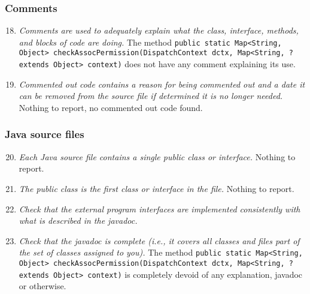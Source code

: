 	\subsubsection{Comments}
		\begin{enumerate}
			\setcounter{enumi}{17}
			\item \textit{Comments are used to adequately explain what the class, interface, methods, and blocks of code are doing.}
			The method \texttt{public static Map<String, Object> checkAssocPermission(DispatchContext dctx, Map<String, ? extends Object> context)} does not have any comment explaining its use. 

			\item \textit{Commented out code contains a reason for being commented out and a date it can be removed from the source file if determined it is no longer needed.}\newline
			Nothing to report, no commented out code found. %

		\end{enumerate}

	\subsubsection{Java source files}
		\begin{enumerate}
			\setcounter{enumi}{19}
			\item \textit{Each Java source file contains a single public class or interface.}\newline
			Nothing to report. %

			\item \textit{The public class is the first class or interface in the file.}\newline
			Nothing to report. %

			\item \textit{Check that the external program interfaces are implemented consistently with what is described in the javadoc.}
	
			\item \textit{Check that the javadoc is complete (i.e., it covers all classes and files part of the set of classes assigned to you).}\newline
			The method \texttt{public static Map<String, Object> checkAssocPermission(DispatchContext dctx, Map<String, ? extends Object> context)} is completely devoid of any explanation, javadoc or otherwise. 

		\end{enumerate}

